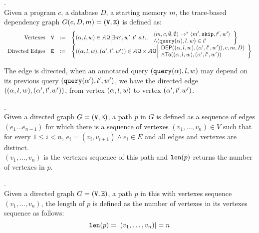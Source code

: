 \documentclass[a4paper,11pt]{article}
\begin{document}
\begin{defn}.
\label{def:trace-based_graph}
\\
Given a program $c$, a database $D$, a starting memory $m$, the trace-based dependency graph $G(c,D,m) = (\mathtt{V}, \mathtt{E})$ is defined as: 
%
\[
\begin{array}{rlcl}
	\text{Vertexes} &
	\vertxs & := & \left\{ 
	({\qval}, l,w) \in \mathcal{AQ} \middle\vert
	\exists m',  w', t' ~ s.t., ~  
	\begin{array}{l}
	\config{m ,c, \emptyset, \emptyset}  
	\to^{*}  
	\config{m' , \eskip, t', w' } \\ 
	\land (\query({\qval}), l, w) \in t'
	\end{array}
	\right\}
	\\
	\text{Directed Edges} &
	\edges & := & 
	\left\{ 
	(({\qval},l,w),({\qval}',l',w')) \in \mathcal{AQ} \times \mathcal{AQ} 
	\middle\vert
	\begin{array}{l}
		\mathsf{DEP}(({\qval},l,w), ({\qval}',l',w')),c,m,D) \\
		\land 
		\mathsf{To}(({\qval},l,w), ({\qval}',l',w'))
	\end{array}
	\right\}
\end{array}
\]
\end{defn}
The edge is directed, when an annotated query $({\tt query}({\alpha}),l,w)$ may depend on its previous query $({\tt query}({\alpha}'),l',w')$, we have the directed
edge $(({\alpha},l,w), ({\alpha}',l'.w'))$, 
from vertex $(\alpha,l,w) $ to vertex $({\alpha}',l'.w')$.
%
%
\begin{defn}[path ($p$)].
\\
Given a directed graph $G = (\mathtt{V}, \mathtt{E})$, a path $p$ in $G$ is defined as a sequence of edges $(e_1\ldots e_{n - 1})$ for which there is a sequence of vertexes $(v_1, \ldots, v_n) \in V$ 
such that for every $1 \leq i < n$, $e_i=(v_{i},v_{i + 1}) \land e_i \in E$  and all edges and vertexes are distinct. 
\\
$(v_1, \ldots, v_n)$ is the vertexes sequence of this path and $\mathtt{len}(p)$ returns the number of vertexes in $p$.
\end{defn}
%
\begin{defn}.
\\
Given a directed graph $G = (\mathtt{V}, \mathtt{E})$, a path $p$ in this with vertexes sequence
$(v_1, \ldots, v_n)$, the length of $p$ is defined as the number of vertexes in its vertexes sequence as follows:
\[
\mathtt{len}(p) = \vert (v_1, \ldots, v_n) \vert = n
\]
\end{defn}
\end{document}
